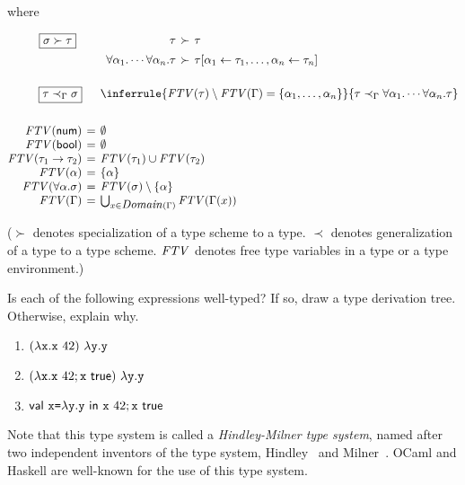 \begin{exercise}
where

\vspace{-1em}

\[
\begin{array}{@{}r@{\hskip4pt}c@{\hskip4pt}l@{}}
  \begin{array}{c}
    \fbox{$\sigma\succ\tau$} \\[0.5em]
    \ \\[1em]
  \end{array}
  &&
  \begin{array}{r@{\hskip4pt}c@{\hskip4pt}l}
    \tau&\succ&\tau \\[0.5em]
    \tforall{\alpha_1}{\cdots\tforall{\alpha_n}{\tau}}&\succ&
    \tau[\alpha_1\leftarrow\tau_1,\ldots,\alpha_n\leftarrow\tau_n]\\[1em]
  \end{array}
  \\[2em]
  \fbox{$\tau\prec_\Gamma\sigma$}
  &&
  \inferrule
  { \embox{FTV}(\tau)\setminus\embox{FTV}(\Gamma)=\{\alpha_1,\ldots,\alpha_n\} }
  { \tau\prec_\Gamma\tforall{\alpha_1}{\cdots\tforall{\alpha_n}{\tau}} }
  \\[2em]
\embox{FTV}(\tnum) &=& \emptyset
\\
\embox{FTV}(\tbool) &=& \emptyset
\\
\embox{FTV}(\tarrow{\tau_1}{\tau_2}) &=& \embox{FTV}(\tau_1) \cup \embox{FTV}(\tau_2)
\\
\embox{FTV}(\alpha) &=& \{\alpha\}
\\
  \embox{FTV}(\tforall{\alpha}{\sigma}) &=& \embox{FTV}(\sigma) \setminus \{\alpha\}
\\
\embox{FTV}(\Gamma) &=& \bigcup_{x\in\dom{\Gamma}}\embox{FTV}(\Gamma(x))
\\
\end{array}
\]

($\succ$ denotes specialization of a type scheme to a type. $\prec$ denotes
generalization of a type to a type scheme. $\mbox{\emph{FTV}}$ denotes free type
variables in a type or a type environment.)

Is each of the following expressions well-typed? If so, draw a type derivation
tree. Otherwise, explain why.

\begin{enumerate}
  \item $(\lambda\texttt{x}.\texttt{x}\ 42)\ \lambda\texttt{y}.\texttt{y}$
  \item $(\lambda\texttt{x}.\texttt{x}\ 42;\texttt{x}\ \textsf{true})\ \lambda\texttt{y}.\texttt{y}$
  \item $\textsf{val}\ \texttt{x}\texttt{=}\lambda\texttt{y}.\texttt{y}\ \textsf{in}\ \texttt{x}\ 42;\texttt{x}\ \textsf{true}$
\end{enumerate}

Note that this type system is called a \textit{Hindley-Milner type
system}, named after two independent inventors
of the type system, Hindley~\cite{hindley1969principal} and
Milner~\cite{milner1978theory}. OCaml and Haskell are well-known for the use of
this type system.

\end{exercise}
